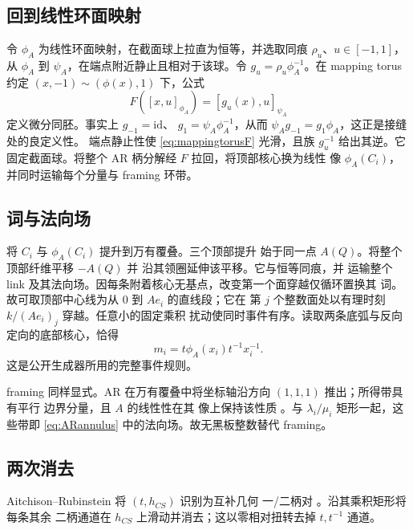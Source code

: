 \subsection{回到线性环面映射}

令 $\phi_A$ 为线性环面映射，在截面球上拉直为恒等，并选取同痕 $\rho_u$、$u\in[-1,1]$，从 $\phi_A$ 到
$\psi_A$，在端点附近静止且相对于该球。令
$g_u=\rho_u\phi_A^{-1}$。在 mapping torus 约定
$(x,-1)\sim(\phi(x),1)$ 下，公式
\begin{equation}\label{eq:mappingtorusF}
F([x,u]_{\phi_A})=[g_u(x),u]_{\psi_A}
\end{equation}
定义微分同胚。事实上 $g_{-1}=\mathrm{id}$、
$g_1=\psi_A\phi_A^{-1}$，从而
$\psi_Ag_{-1}=g_1\phi_A$，这正是接缝处的良定义性。
端点静止性使 \eqref{eq:mappingtorusF} 光滑，且族
$g_u^{-1}$ 给出其逆。它固定截面球。将整个
AR 柄分解经 $F$ 拉回，将顶部核心换为线性
像 $\phi_A(C_i)$，并同时运输每个分量与 framing 环带。

\subsection{词与法向场}

将 $C_i$ 与 $\phi_A(C_i)$ 提升到万有覆叠。三个顶部提升
始于同一点 $A(Q)$。将整个顶部纤维平移 $-A(Q)$ 并
沿其领圈延伸该平移。它与恒等同痕，并
运输整个 link 及其法向场。因每条附着核心无基点，改变第一个面穿越仅循环置换其
词。故可取顶部中心线为从 $0$ 到 $Ae_i$ 的直线段；它在
第 $j$ 个整数面处以有理时刻 $k/(Ae_i)_j$ 穿越。任意小的固定乘积
扰动使同时事件有序。读取两条底弧与反向定向的底部核心，恰得
\begin{equation}\label{eq:actualword}
m_i=t\phi_A(x_i)t^{-1}x_i^{-1}.
\end{equation}
这是公开生成器所用的完整事件规则。

framing 同样显式。AR 在万有覆叠中将坐标轴沿方向 $(1,1,1)$ 推出；所得带具有平行
边界分量，且 $A$ 的线性性在其
像上保持该性质 \cite[pp.~16--17]{AitchisonRubinstein1984}。与
$\lambda_i/\mu_i$ 矩形一起，这些带即 \eqref{eq:ARannulus} 中的法向场。故无黑板整数替代
framing。

\subsection{两次消去}

Aitchison--Rubinstein 将 $(t,h_{CS})$ 识别为互补几何
一/二柄对 \cite[p.~7]{AitchisonRubinstein1984}。沿其乘积矩形将每条其余
二柄通道在 $h_{CS}$ 上滑动并消去；这以零相对扭转去掉 $t,t^{-1}$ 通道。

